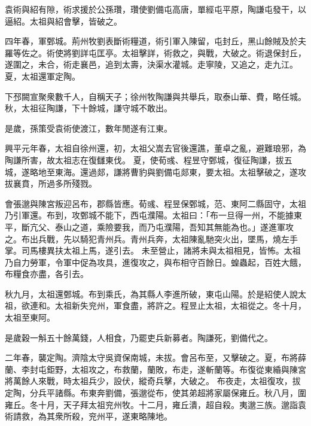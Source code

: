 \begin{pinyinscope}
袁術與紹有隙，術求援於公孫瓚，瓚使劉備屯高唐，單經屯平原，陶謙屯發干，以逼紹。太祖與紹會擊，皆破之。


四年春，軍鄄城。荊州牧劉表斷術糧道，術引軍入陳留，屯封丘，黑山餘賊及於夫羅等佐之。術使將劉詳屯匡亭。太祖擊詳，術救之，與戰，大破之。術退保封丘，遂圍之，未合，術走襄邑，追到太壽，決渠水灌城。走寧陵，又追之，走九江。夏，太祖還軍定陶。


下邳闕宣聚衆數千人，自稱天子；徐州牧陶謙與共舉兵，取泰山華、費，略任城。秋，太祖征陶謙，下十餘城，謙守城不敢出。


是歲，孫策受袁術使渡江，數年閒遂有江東。


興平元年春，太祖自徐州還，初，太祖父嵩去官後還譙，董卓之亂，避難琅邪，為陶謙所害，故太祖志在復讎東伐。
夏，使荀彧、程昱守鄄城，復征陶謙，拔五城，遂略地至東海。還過郯，謙將曹豹與劉備屯郯東，要太祖。太祖擊破之，遂攻拔襄賁，所過多所殘戮。


會張邈與陳宮叛迎呂布，郡縣皆應。荀彧、程昱保鄄城，范、東阿二縣固守，太祖乃引軍還。布到，攻鄄城不能下，西屯濮陽。太祖曰：「布一旦得一州，不能據東平，斷亢父、泰山之道，乘險要我，而乃屯濮陽，吾知其無能為也。」遂進軍攻之。布出兵戰，先以騎犯青州兵。青州兵奔，太祖陳亂馳突火出，墜馬，燒左手掌。司馬樓異扶太祖上馬，遂引去。
未至營止，諸將未與太祖相見，皆怖。太祖乃自力勞軍，令軍中促為攻具，進復攻之，與布相守百餘日。蝗蟲起，百姓大餓，布糧食亦盡，各引去。


秋九月，太祖還鄄城。布到乘氏，為其縣人李進所破，東屯山陽。於是紹使人說太祖，欲連和。太祖新失兖州，軍食盡，將許之。程昱止太祖，太祖從之。冬十月，太祖至東阿。


是歲穀一斛五十餘萬錢，人相食，乃罷吏兵新募者。陶謙死，劉備代之。


二年春，襲定陶。濟陰太守吳資保南城，未拔。會呂布至，又擊破之。夏，布將薛蘭、李封屯鉅野，太祖攻之，布救蘭，蘭敗，布走，遂斬蘭等。布復從東緍與陳宮將萬餘人來戰，時太祖兵少，設伏，縱奇兵擊，大破之。
布夜走，太祖復攻，拔定陶，分兵平諸縣。布東奔劉備，張邈從布，使其弟超將家屬保雍丘。秋八月，圍雍丘。冬十月，天子拜太祖兖州牧。十二月，雍丘潰，超自殺。夷邈三族。邈詣袁術請救，為其衆所殺，兖州平，遂東略陳地。



\end{pinyinscope}
